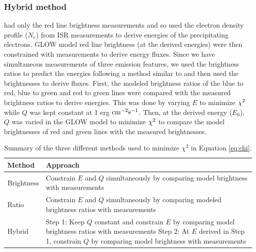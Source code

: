 \subsubsection{Hybrid method}
\label{sec:2step}

\cite{pallamraju_2011} had only the red line brightness measurements and so used the electron density profile ($N_e$) from ISR measurements to derive energies of the precipitating electrons. GLOW model red line brightness (at the derived energies) were then constrained with measurements to derive energy fluxes. Since we have simultaneous measurements of three emission features, we used the brightness ratios to predict the energies following a method similar to \cite{rees_1974} and then used the brightnesses to derive fluxes. First, the modeled brightness ratios of the blue to red, blue to green and red to green lines were compared with the measured brightness ratios to derive energies. This was done by varying $E$ to minimize $\rm \chi^2$ while $Q$ was kept constant at 1 erg $\rm cm^{-2} s^{-1}$. Then, at the derived energy ($E_0$), $Q$ was varied in the GLOW model to minimize $\rm \chi^2$ to compare the model brightnesses of red and green lines with the measured brightnesses. 


\begin{table}
	
	\caption{Summary of the three different methods used to minimize $\chi^2$ in Equation \ref{eq:chi}.}
	\begin{tabular}{|l|l|}
		\hline
		
		Method &  Approach \\
		\hline
		\centering
		Brightness & \makecell{Constrain $E$ and $Q$ simultaneously\\ by comparing model brightness with measurements}\\ 
		
		\hline
		Ratio  &  \makecell{Constrain $E$ and $Q$ simultaneously\\ by comparing modeled brightness ratios with measurements}\\
		\hline
		
		Hybrid & \makecell{Step 1: Keep $Q$ constant and constrain $E$\\
			by comparing model brightness ratios with measurements\\
			\hline			
			Step 2: At $E$ derived in Step 1, constrain $Q$\\
			by comparing model brightness with measurements}\\
		\hline
	\end{tabular}
	\label{table:method}
\end{table}
